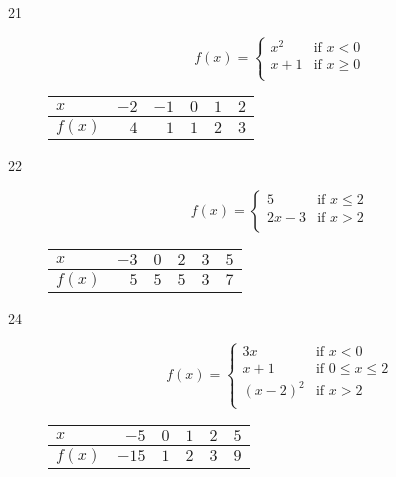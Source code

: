 \documentclass{exam}
\begin{document}
\begin{description}
\pagebreak

    \item[21]
      \[
        f(x) = 
          \begin{cases}
            x^2   & \text{if } x < 0 \\
            x + 1 & \text{if } x \geq 0 \\
          \end{cases}
      \]

      \begin{tabular}{lrrrrr}
        \toprule
        $x$      & $-2$ & $-1$ & $0$ & $1$ & $2$ \\
        \midrule
        $f(x)$   & $4$  & $1$  & $1$ & $2$ & $3$ \\
        \bottomrule
      \end{tabular}

    \item[22]
      \[
        f(x) = 
          \begin{cases}
            5      & \text{if } x \leq 2 \\
            2x - 3 & \text{if } x > 2 \\
          \end{cases}
      \]

      \begin{tabular}{lrrrrr}
        \toprule
        $x$    & $-3$ & $0$ & $2$ & $3$ & $5$ \\ 
        \midrule
        $f(x)$ &  $5$ & $5$ & $5$ & $3$ & $7$ \\
        \bottomrule
      \end{tabular}

    \item[24]
      \[
        f(x) = 
          \begin{cases}
            3x        & \text{if } x < 0 \\
            x + 1     & \text{if } 0 \leq x \leq 2 \\
            (x - 2)^2 & \text{if } x > 2 \\
          \end{cases}
      \]

      \begin{tabular}{lrrrrr}
        \toprule
        $x$    &  $-5$ & $0$ & $1$ & $2$ & $5$ \\ 
        \midrule
        $f(x)$ & $-15$ & $1$ & $2$ & $3$ & $9$ \\
        \bottomrule
      \end{tabular}
      

\end{description}
\end{document}
